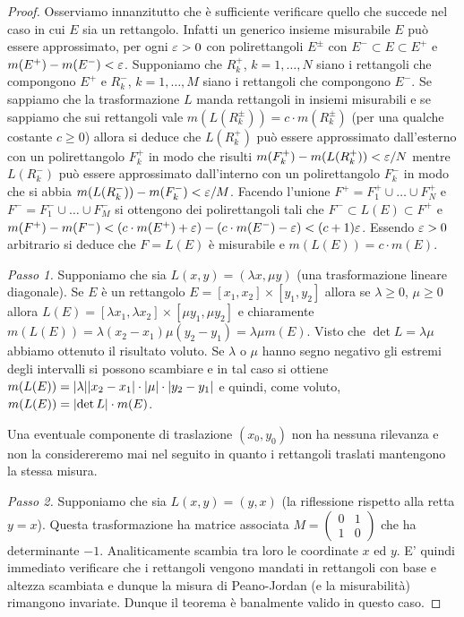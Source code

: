 \begin{proof}

Osserviamo innanzitutto che è sufficiente verificare
quello che succede nel caso in cui $E$ sia un rettangolo.
Infatti un generico insieme misurabile $E$ può essere approssimato,
per ogni $\varepsilon>0$ con polirettangoli $E^\pm$ con $E^-\subset E \subset E^+$ e $m(E^+) - m(E^-) < \varepsilon$.
Supponiamo che $R^+_k$, $k=1,\dots, N$ siano i rettangoli che compongono $E^+$ e $R^-_k$, $k=1,\dots, M$ siano i rettangoli che compongono $E^-$.
Se sappiamo che la trasformazione $L$ manda rettangoli in insiemi
misurabili e se sappiamo che sui rettangoli vale $m(L(R_k^\pm)) = c \cdot m(R_k^\pm)$
(per una qualche costante $c\ge 0$) allora si deduce che $L(R_k^+)$ può essere approssimato dall'esterno con un polirettangolo
$F_k^+$ in modo che risulti $m(F_k^+) - m(L(R_k^+)) < \varepsilon/N$ mentre $L(R_k^-)$ può essere approssimato dall'interno con un polirettangolo $F_k^-$ in modo che si abbia $m(L(R_k^-))-m(F_k^-) < \varepsilon/M$. Facendo l'unione $F^+ = F_1^+ \cup \dots \cup F_N^+$
e $F^- = F_1^- \cup \dots \cup F_M^-$ si ottengono dei polirettangoli tali che $F^- \subset L(E)\subset F^+$ e
$m(F^+) - m(F^-) < (c\cdot  m(E^+) + \varepsilon) - (c \cdot m(E^-) -\varepsilon)
< (c+1) \varepsilon$. Essendo $\varepsilon>0$ arbitrario si deduce
che $F=L(E)$ è misurabile e $m(L(E)) = c\cdot  m(E)$.


\emph{Passo 1.}
Supponiamo che sia
$L(x,y) = (\lambda x,\mu y)$  (una trasformazione lineare diagonale).
Se $E$ è un rettangolo $E=[x_1,x_2]\times[y_1,y_2]$
allora se $\lambda\ge 0$, $\mu\ge 0$ allora $L(E) = [\lambda x_1, \lambda x_2] \times [\mu y_1, \mu y_2]$
e chiaramente $m(L(E)) = \lambda (x_2-x_1) \mu (y_2-y_1) = \lambda \mu m(E)$. Visto che $\det L = \lambda \mu$ abbiamo ottenuto il risultato voluto.
Se $\lambda$ o $\mu$ hanno segno negativo
gli estremi degli intervalli si possono
scambiare e in tal caso si ottiene $m(L(E)) = {\left|\lambda\right|}{\left|x_2-x_1\right|} \cdot {\left|\mu\right|} \cdot {\left|y_2-y_1\right|}$ e quindi, come
voluto, $m(L(E))={\left|\det L\right|} \cdot m(E)$.

Una eventuale componente di traslazione $(x_0,y_0)$ non ha nessuna
rilevanza e non la considereremo mai nel seguito in quanto i rettangoli traslati mantengono la stessa misura.

\emph{Passo 2.}
Supponiamo che sia $L(x,y) = (y,x)$ (la riflessione rispetto alla retta $y=x$). Questa trasformazione ha matrice associata $M=\begin{pmatrix}0&1\\1&0\end{pmatrix}$ che ha determinante
$-1$. Analiticamente scambia tra loro le coordinate $x$ ed $y$.
E' quindi immediato verificare che i rettangoli vengono mandati
in rettangoli con base e altezza scambiata e dunque la misura di
Peano-Jordan (e la misurabilità) rimangono invariate.
Dunque il teorema è banalmente valido in questo caso.


\end{proof}
